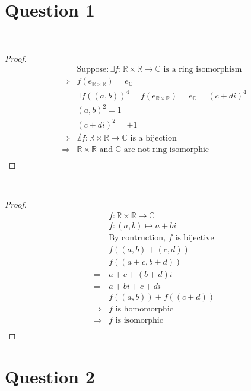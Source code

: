 \documentclass{article}
\begin{document}
\section*{Question 1}

~

\begin{proof}
    \begin{align*}
        &\text{Suppose}:\exists f:\mathbb{R} \times\mathbb{R} \rightarrow \mathbb{C} \text{ is a ring isomorphism}\\
        \Rightarrow&f(e_{\mathbb{R} \times\mathbb{R}})=e_\mathbb{C}\\
        &\exists f((a,b))^4=f(e_{\mathbb{R} \times\mathbb{R}})=e_\mathbb{C}=(c+di)^4\\
        &(a,b)^2=1\\
        &(c+di)^2=\pm 1\\
        \Rightarrow&\nexists f:\mathbb{R} \times\mathbb{R} \rightarrow \mathbb{C}\text{ is a bijection}\\
        \Rightarrow&\mathbb{R} \times\mathbb{R}\text{ and }\mathbb{C}\text{ are not ring isomorphic}\\
    \end{align*}
\end{proof}

~

\begin{proof}
    \begin{align*}
        &f:\mathbb{R} \times\mathbb{R} \rightarrow \mathbb{C}\\
        &f:(a,b)\mapsto a+bi\\
        &\text{By contruction, }f\text{ is bijective}\\
        &f((a,b)+(c,d))\\
        =&f((a+c,b+d))\\
        =&a+c+(b+d)i\\
        =&a+bi+c+di\\
        =&f((a,b))+f((c+d))\\
        \Rightarrow&f\text{ is homomorphic}\\
        \Rightarrow&f\text{ is isomorphic}\\    
    \end{align*}
\end{proof}

\newpage

\section*{Question 2}
\end{document}
